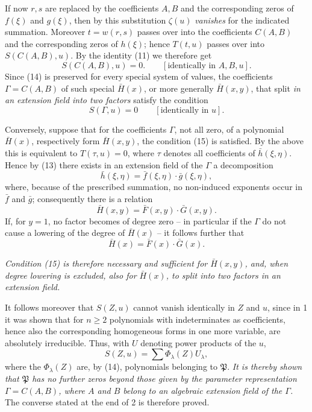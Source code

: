 \documentclass[11pt]{article}
\begin{document}
If now $r,s$ are replaced by the coefficients $A,B$ and the corresponding zeros of $f(\xi)$ and $g(\xi)$, then by this substitution $\zeta(u)$ \emph{vanishes} for the indicated summation. Moreover $t=w(r,s)$ passes over into the coefficients $C(A,B)$ and the corresponding zeros of $h(\xi)$; hence $T(t,u)$ passes over into $S(C(A,B),u)$. By the identity (11) we therefore get
\begin{equation}
 S(C(A,B),u)=0.\qquad[\text{identically in }A,B,u].
\tag{14}
\end{equation}
Since (14) is preserved for every special system of values, the coefficients $\Gamma=C(A,B)$ of such special $\bar H(x)$, or more generally $\bar H(x,y)$, that split \emph{in an extension field into two factors} satisfy the condition
\begin{equation}
 S(\Gamma,u)=0\qquad[\text{identically in }u].
\tag{15}
\end{equation}

Conversely, suppose that for the coefficients $\Gamma$, not all zero, of a polynomial $\bar H(x)$, respectively form $\bar H(x,y)$, the condition (15) is satisfied. By the above this is equivalent to $T(\tau,u)=0$, where $\tau$ denotes all coefficients of $\bar h(\xi,\eta)$. Hence by (13) there exists in an extension field of the $\Gamma$ a decomposition
\[
 \bar h(\xi,\eta)=\bar f(\xi,\eta)\cdot\bar g(\xi,\eta),
\]
where, because of the prescribed summation, no non-induced exponents occur in $\bar f$ and $\bar g$; consequently there is a relation
\[
 \bar H(x,y)=\bar F(x,y)\cdot\bar G(x,y).
\]
If, for $y=1$, no factor becomes of degree zero -- in particular if the $\Gamma$ do not cause a lowering of the degree of $\bar H(x)$ -- it follows further that
\[
 \bar H(x)=\bar F(x)\cdot\bar G(x).
\]

\emph{Condition (15) is therefore necessary and sufficient for $\bar H(x,y)$, and, when degree lowering is excluded, also for $\bar H(x)$, to split into two factors in an extension field.}

It follows moreover that $S(Z,u)$ cannot vanish identically in $Z$ and $u$, since in 1 it was shown that for $n\ge2$ polynomials with indeterminates as coefficients, hence also the corresponding homogeneous forms in one more variable, are absolutely irreducible. Thus, with $U$ denoting power products of the $u$,
\[
 S(Z,u)=\sum \Phi_\lambda(Z)U_\lambda,
\]
where the $\Phi_\lambda(Z)$ are, by (14), polynomials belonging to $\mathfrak P$. \emph{It is thereby shown that $\mathfrak P$ has no further zeros beyond those given by the parameter representation $\Gamma=C(A,B)$, where $A$ and $B$ belong to an algebraic extension field of the $\Gamma$.} The converse stated at the end of 2 is therefore proved.
\end{document}

